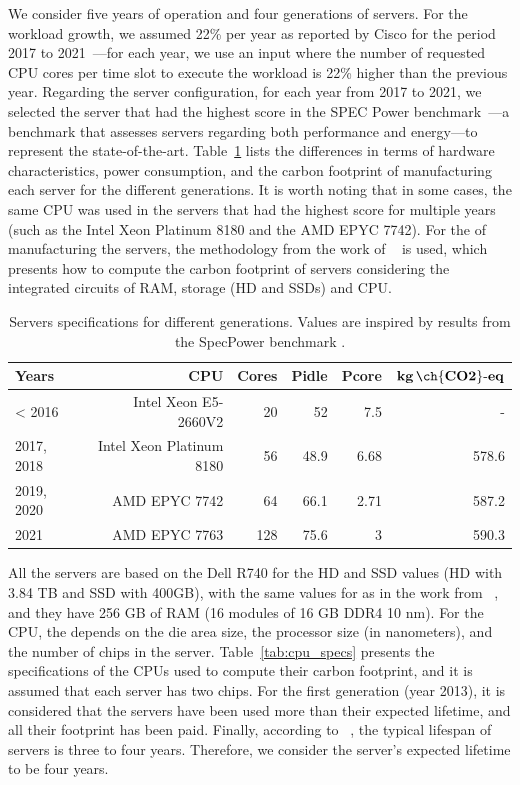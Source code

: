 We consider five years of operation and four generations of servers. For the workload growth, we assumed 22\% per year as reported by Cisco for the period 2017 to 2021~\cite{cisco_global_cloud_index_2018}---for each year, we use an input where the number of requested CPU cores per time slot to execute the workload is 22\% higher than the previous year. Regarding the server configuration, for each year from 2017 to 2021, we selected the server that had the highest score in the SPEC Power benchmark~\cite{spec_power}---a benchmark that assesses servers regarding both performance and energy---to represent the state-of-the-art. Table~\ref{tab:servers_specs} lists the differences in terms of hardware characteristics, power consumption, and the carbon footprint of manufacturing each server for the different generations. It is worth noting that in some cases, the same CPU was used in the servers that had the highest score for multiple years (such as the Intel Xeon Platinum 8180 and the AMD EPYC 7742). For the  of manufacturing the servers, the methodology from the work of ~\citet{gupta2022_ACT} is used, which presents how to compute the carbon footprint of servers considering the integrated circuits of  RAM, storage (HD and SSDs) and CPU.

\begin{table}[h]
  \small
  \caption{Servers specifications for different generations. Values are inspired by results from the SpecPower benchmark \cite{spec_2014,spec_2017,spec_2016,spec_2019,spec_2021}.} \centering
  \label{tab:servers_specs} 
  \begin{tabular}{|l|r|r|r|r|r|}
  \hline    
  \textbf{Years} & \textbf{CPU} &   \textbf{Cores} & \textbf{Pidle}  & \textbf{Pcore}  & \textbf{$\mathbf{kg\,\ch{CO2}\text{-}eq}$}  \\
  \hline
  < 2016      & Intel Xeon E5-2660V2 & 20 & 52 & 7.5  & -   \\
  \hline
  2017, 2018  & Intel Xeon Platinum 8180 & 56 & 48.9 & 6.68  & 578.6   \\
  \hline
  2019, 2020   & AMD EPYC 7742  & 64 & 66.1 & 2.71  & 587.2 \\
  \hline
  2021        & AMD EPYC 7763 & 128 & 75.6 & 3     & 590.3 \\
  \hline
\end{tabular}  
\end{table}

All the servers are based on the Dell R740 for the HD and SSD values (HD with 3.84 TB and SSD with 400GB), with the same values for  as in the work from ~\citet{gupta2022_ACT}, and they have 256 GB of RAM (16 modules of 16 GB DDR4 10 nm). For the CPU, the  depends on the die area size, the processor size (in nanometers), and the number of chips in the server. Table~\ref{tab:cpu_specs} presents the specifications of the CPUs used to compute their carbon footprint, and it is assumed that each server has two chips. For the first generation (year 2013), it is considered that the servers have been used more than their expected lifetime, and all their  footprint has been paid. Finally, according to ~\citet{datacenter_as_computer}, the typical lifespan of servers is three to four years. Therefore, we consider the server's expected lifetime to be four years.


